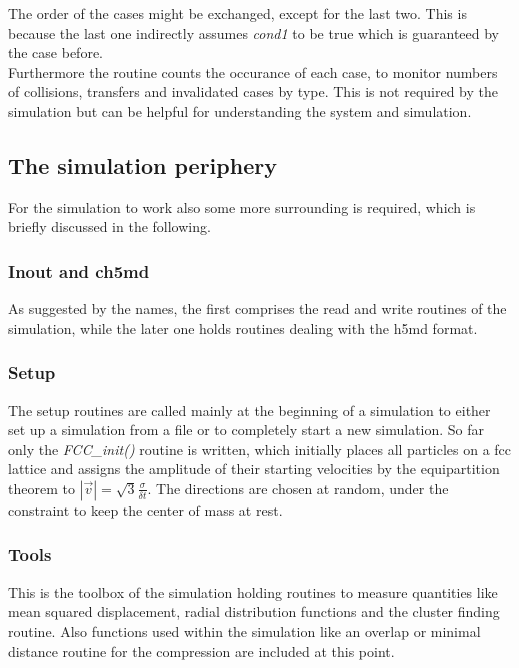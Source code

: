 The order of the cases might be exchanged, except for the last two. This is because the last one indirectly assumes \textit{cond1} to be true which is guaranteed by the case before.\\

Furthermore the routine counts the occurance of each case, to monitor numbers of collisions, transfers and invalidated cases by type. This is not required by the simulation but can be helpful for understanding the system and simulation.\\

\subsection{The simulation periphery}
For the simulation to work also some more surrounding is required, which is briefly discussed in the following.
 
\subsubsection{Inout and ch5md}
As suggested by the names, the first comprises the read and write routines of the simulation, while the later one holds routines dealing with the h5md format.

\subsubsection{Setup}
The setup routines are called mainly at the beginning of a simulation to either set up a simulation from a file or to completely start a new simulation. So far only the \textit{FCC\_init()} routine is written, which initially places all particles on a fcc lattice and assigns the amplitude of their starting velocities by the equipartition theorem to $|\vec{v}| = \sqrt{3}\frac{\sigma}{\delta t}$. The directions are chosen at random, under the constraint to keep the center of mass at rest.

\subsubsection{Tools}
This is the toolbox of the simulation holding routines to measure quantities like mean squared displacement, radial distribution functions and the cluster finding routine. Also functions used within the simulation like an overlap or minimal distance routine for the compression are included at this point.\\

